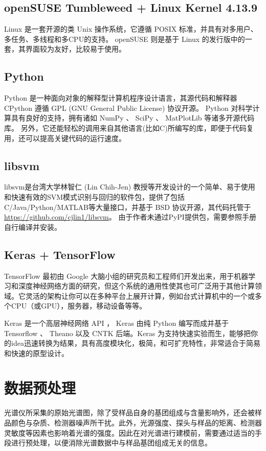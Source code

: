 \documentclass[a4paper, 12pt]{article}
\begin{document}
		\subsection{openSUSE Tumbleweed + Linux Kernel 4.13.9}
			Linux 是一套开源的类 Unix 操作系统，它遵循 POSIX 标准，并具有对多用户、多任务、多线程和多CPU的支持。 
			openSUSE 则是基于 Linux 的发行版中的一套，其界面较为友好，比较易于使用。
		\subsection{Python}
			Python 是一种面向对象的解释型计算机程序设计语言，其源代码和解释器 CPython 遵循 GPL (GNU General Public License) 协议开源。
			Python 对科学计算具有良好的支持，拥有诸如 NumPy 、 SciPy 、 MatPlotLib 等诸多开源代码库。
			另外，它还能轻松的调用来自其他语言(比如C)所编写的库，即便于代码复用，还可以提高关键代码的运行速度。
		\subsection{libsvm}
			libsvm是台湾大学林智仁 (Lin Chih-Jen) 教授等开发设计的一个简单、易于使用和快速有效的SVM模式识别与回归的软件包，提供了包括C/Java/Python/MATLAB等大量接口，并基于 BSD 协议开源，其代码托管于\url{https://github.com/cjlin1/libsvm}。
			由于作者未通过PyPI提供包，需要参照手册自行编译并安装。
		\subsection{Keras + TensorFlow}
			TensorFlow 最初由 Google 大脑小组的研究员和工程师们开发出来，用于机器学习和深度神经网络方面的研究，但这个系统的通用性使其也可广泛用于其他计算领域。它灵活的架构让你可以在多种平台上展开计算，例如台式计算机中的一个或多个CPU（或GPU），服务器，移动设备等等。
			
			Keras 是一个高层神经网络 API ， Keras 由纯 Python 编写而成并基于 Tensorflow 、 Theano 以及 CNTK 后端。Keras 为支持快速实验而生，能够把你的idea迅速转换为结果，具有高度模块化，极简，和可扩充特性，非常适合于简易和快速的原型设计。
			
	\section{数据预处理}
		光谱仪所采集的原始光谱图，除了受样品自身的基团组成与含量影响外，还会被样品颜色与杂质、检测器噪声所干扰。此外，光源强度、探头与样品的矩离、检测器灵敏度等因素也影响着光谱的强度。因此在对光谱进行建模前，需要通过适当的手段进行预处理，以便消除光谱数据中与样品基团组成无关的信息。
		
\end{document}
